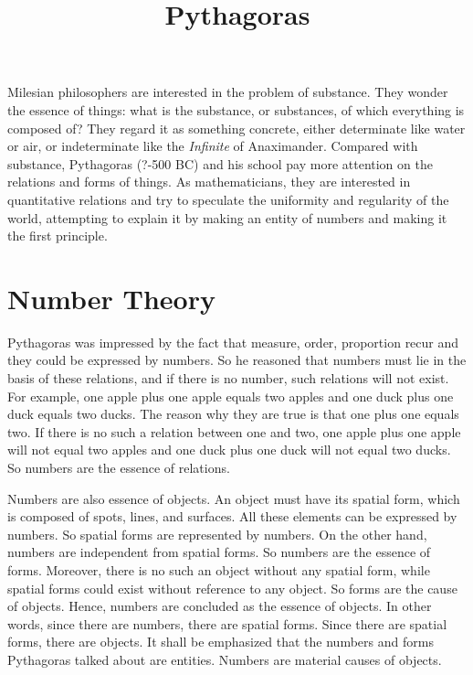 \documentclass[11pt]{article}
\title{Pythagoras}
\date{}
\begin{document}
  \maketitle
  
  \newpage

  \linenumbers
  
Milesian philosophers are interested in the problem of substance. 
They wonder the essence of things: what is the substance, or substances, of which everything is composed of? 
They regard it as something concrete, either determinate like water or air, or indeterminate like the \textit{Infinite} of Anaximander. 
Compared with substance, Pythagoras (?-500 BC) and his school pay more attention on the relations and forms of things. 
As mathematicians, they are interested in quantitative relations and try to speculate the uniformity and regularity of the world, attempting to explain it by making an entity of numbers and making it the first principle.

\section{Number Theory}
Pythagoras was impressed by the fact that measure, order, proportion recur and they could be expressed by numbers. 
So he reasoned that numbers must lie in the basis of these relations, and if there is no number, such relations will not exist. 
For example, one apple plus one apple equals two apples and one duck plus one duck equals two ducks. 
The reason why they are true is that one plus one equals two. 
If there is no such a relation between one and two, one apple plus one apple will not equal two apples and one duck plus one duck will not equal two ducks. 
So numbers are the essence of relations.

\newline

Numbers are also essence of objects. 
An object must have its spatial form, which is composed of spots, lines, and surfaces. 
All these elements can be expressed by numbers. 
So spatial forms are represented by numbers. 
On the other hand, numbers are independent from spatial forms. 
So numbers are the essence of forms. 
Moreover, there is no such an object without any spatial form, while spatial forms could exist without reference to any object. 
So forms are the cause of objects. 
Hence, numbers are concluded as the essence of objects. 
In other words, since there are numbers, there are spatial forms. 
Since there are spatial forms, there are objects. 
It shall be emphasized that the numbers and forms Pythagoras talked about are entities. 
Numbers are material causes of objects. 
\end{document}
